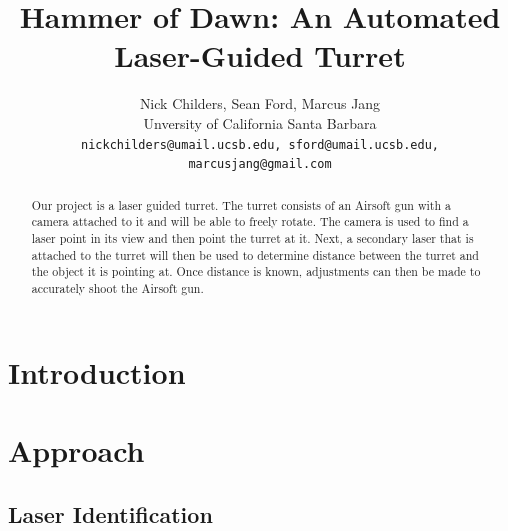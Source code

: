 \documentclass[10pt,twocolumn,letterpaper]{article}
\begin{document}
\title{Hammer of Dawn: An Automated Laser-Guided Turret}

\author{Nick Childers, Sean Ford, Marcus Jang\\
Unversity of California Santa Barbara\\
{\tt\small nickchilders@umail.ucsb.edu, sford@umail.ucsb.edu, marcusjang@gmail.com}
}

\maketitle
\thispagestyle{empty}

\begin{abstract}
Our project is a laser guided turret. The turret consists of an Airsoft gun with a camera attached to it and will be able to freely rotate. The camera is used to find a laser point in its view and then point the turret at it. Next, a secondary laser that is attached to the turret will then be used to determine distance between the turret and the object it is pointing at. Once distance is known, adjustments can then be made to accurately shoot the Airsoft gun.
\end{abstract}


\section{Introduction}


\section{Approach}


\subsection{Laser Identification}
\end{document}
